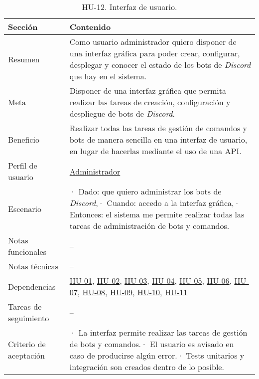 \begin{table}[H]
    \centering
    \def\arraystretch{1.25}
    \begin{adjustbox}{max width=\textwidth}
    \begin{tabularx}{\textwidth}{|l|L|}
    \hline
        \textbf{Sección} & \textbf{Contenido} \\ \hline
    \hline
        Resumen & Como usuario administrador quiero disponer de una interfaz gráfica para poder crear, configurar, desplegar y conocer el estado de los bots de \textit{Discord} que hay en el sistema. \\ \hline
        Meta & Disponer de una interfaz gráfica que permita realizar las tareas de creación, configuración y despliegue de bots de \textit{Discord}. \\ \hline
        Beneficio & Realizar todas las tareas de gestión de comandos y bots de manera sencilla en una interfaz de usuario, en lugar de hacerlas mediante el uso de una API. \\ \hline
        Perfil de usuario & \hyperref[sec:personaAdmin]{Administrador} \\ \hline
        Escenario & · Dado: que quiero administrar los bots de \textit{Discord},\linebreak · Cuando: accedo a la interfaz gráfica,\linebreak · Entonces: el sistema me permite realizar todas las tareas de administración de bots y comandos. \\ \hline
        Notas funcionales & – \\ \hline
        Notas técnicas & – \\ \hline
        Dependencias & \hyperref[sec:hu01]{HU-01}, \hyperref[sec:hu02]{HU-02}, \hyperref[sec:hu03]{HU-03}, \hyperref[sec:hu04]{HU-04}, \hyperref[sec:hu05]{HU-05}, \hyperref[sec:hu06]{HU-06}, \hyperref[sec:hu07]{HU-07}, \hyperref[sec:hu08]{HU-08}, \hyperref[sec:hu09]{HU-09}, \hyperref[sec:hu10]{HU-10}, \hyperref[sec:hu11]{HU-11} \\ \hline
        Tareas de seguimiento & – \\ \hline
        Criterio de aceptación & · La interfaz permite realizar las tareas de gestión de bots y comandos.\linebreak · El usuario es avisado en caso de producirse algún error.\linebreak · Tests unitarios y integración son creados dentro de lo posible. \\ \hline
    \end{tabularx}
    \end{adjustbox}
    \caption{HU-12. Interfaz de usuario.}
\end{table}

